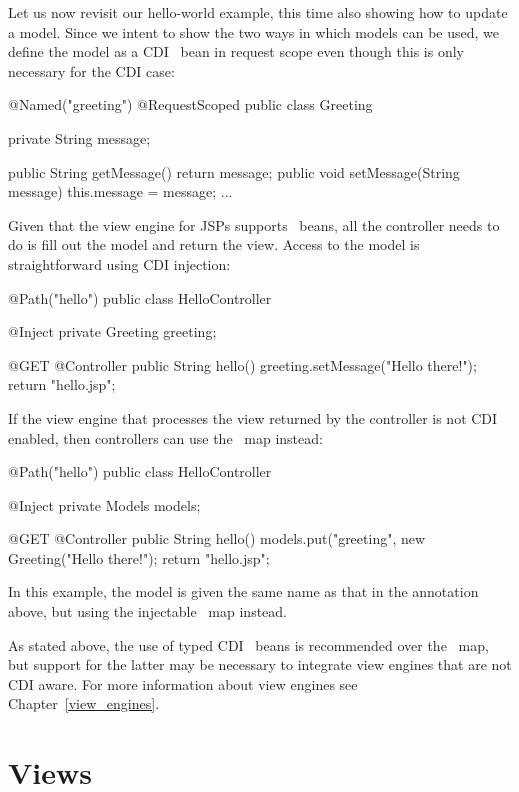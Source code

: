 Let us now revisit our hello-world example, this time also showing how to update
a model. Since we intent to show the two ways in which models can be used, we define the
model as a CDI \Named\ bean in request scope even though this is only necessary
for the CDI case:

\begin{listing}{1}
@Named("greeting")
@RequestScoped
public class Greeting {

	private String message;
	
	public String getMessage() { return message; }
	public void setMessage(String message) { this.message = message; }
	...
}
\end{listing}

Given that the view engine for JSPs supports \Named\ beans, all the controller
needs to do is fill out the model and return the view. Access to the model
is straightforward using CDI injection:

\begin{listing}{1}
@Path("hello")
public class HelloController {

	@Inject
	private Greeting greeting;

    @GET
    @Controller
    public String hello() {
        greeting.setMessage("Hello there!");
        return "hello.jsp";
    }
}
\end{listing}

If the view engine that processes the view returned by the controller is not CDI 
enabled, then controllers can use the \Models\ map instead:

\begin{listing}{1}
@Path("hello")
public class HelloController {

	@Inject
	private Models models;

    @GET
    @Controller
    public String hello() {
        models.put("greeting", new Greeting("Hello there!");
        return "hello.jsp";
    }
}
\end{listing}

In this example, the model is given the same name as that in the 
annotation above, but using the injectable \Models\ map instead.

As stated above, the use of typed CDI \Named\ beans is recommended over the \Models\ map,
but support for the latter may be necessary to integrate view engines that are not
CDI aware. For more information about view engines see Chapter~\ref{view_engines}.

\section{Views}
\label{views}

